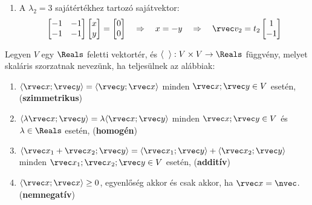 \begin{example}
\begin{enumerate}
    \item A $\lambda_2 = 3$ sajátértékhez tartozó sajátvektor:
          $$
            \begin{bmatrix}
              -1 & -1 \\
              -1 & -1
            \end{bmatrix} \begin{bmatrix}
              x \\
              y
            \end{bmatrix} = \begin{bmatrix}
              0 \\
              0
            \end{bmatrix}
            \quad \Rightarrow \quad
            x = -y
            \quad \Rightarrow \quad
            \rvec v_2 = t_2 \begin{bmatrix}
              1 \\
              -1
            \end{bmatrix}
          $$
  \end{enumerate}
\end{example}

\begin{definition}
  Legyen $V$ egy $\Reals$ feletti vektortér, és $\langle \phantom{x} \rangle: V
    \times V \rightarrow \Reals$ függvény, melyet skaláris szorzatnak nevezünk,
  ha teljesülnek az alábbiak:
  \begin{enumerate}
    \item $\langle \rvec x; \rvec y \rangle = \langle \rvec y;
            \rvec x \rangle$ minden $\rvec x; \rvec y \in V$ esetén,
          \hfill (\textbf{szimmetrikus})

    \item $\langle \lambda \rvec x; \rvec y \rangle = \lambda \langle \rvec x;
            \rvec y \rangle$ minden $\rvec x; \rvec y \in V$ és $\lambda \in
            \Reals$ esetén,
          \hfill (\textbf{homogén})

    \item $\langle \rvec x_1 + \rvec x_2; \rvec y \rangle = \langle \rvec x_1;
            \rvec y \rangle + \langle \rvec x_2; \rvec y \rangle$ minden $\rvec
            x_1; \rvec x_2; \rvec y \in V$ esetén,
          \hfill (\textbf{additív})

    \item $\langle \rvec x; \rvec x \rangle \geq 0$,
          egyenlőség akkor és csak akkor, ha $\rvec x = \nvec$.
          \hfill (\textbf{nemnegatív})
  \end{enumerate}
\end{definition}


